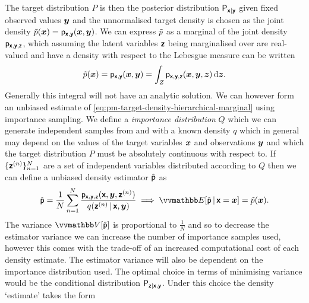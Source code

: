 The target distribution $P$ is then the posterior distribution $\mathsf{P}_{\boldsymbol{\mathsf{x}}|\boldsymbol{\mathsf{y}}}$ given fixed observed values $\boldsymbol{y}$ and the unnormalised target density is chosen as the joint density $\tilde{p}(\boldsymbol{x}) = \mathsf{p}_{\boldsymbol{\mathsf{x}},\boldsymbol{\mathsf{y}}}(\boldsymbol{x},\boldsymbol{y})$. We can express $\tilde{p}$ as a marginal of the joint density $\mathsf{p}_{\boldsymbol{\mathsf{x}},\boldsymbol{\mathsf{y}},\boldsymbol{\mathsf{z}}}$, which assuming the latent variables $\boldsymbol{\mathsf{z}}$ being marginalised over are real-valued and have a density with respect to the Lebesgue measure can be written
\begin{equation}\label{eq:pm-target-density-hierarchical-marginal}
  \tilde{p}(\boldsymbol{x}) = \mathsf{p}_{\boldsymbol{\mathsf{x}},\boldsymbol{\mathsf{y}}}(\boldsymbol{x},\boldsymbol{y}) =
  \int_{\mathit{Z}} \mathsf{p}_{\boldsymbol{\mathsf{x}},\boldsymbol{\mathsf{y}},\boldsymbol{\mathsf{z}}}(\boldsymbol{x},\boldsymbol{y},\boldsymbol{z}) \,\mathrm{d}\boldsymbol{z}.
\end{equation}
Generally this integral will not have an analytic solution. We can however form an unbiased estimate of \eqref{eq:pm-target-density-hierarchical-marginal} using importance sampling. We define a \emph{importance distribution} $Q$ which we can generate independent samples from and with a known density $q$ which in general may depend on the values of the target variables $\boldsymbol{x}$ and observations $\boldsymbol{y}$ and which the target distribution $P$ must be absolutely continuous with respect to. If $\lbrace \boldsymbol{\mathsf{z}}^{(n)} \rbrace_{n=1}^N$ are a set of independent variables distributed according to $Q$ then we can define a unbiased density estimator $\hat{\mathsf{p}}$ as
\begin{equation}\label{eq:pm-hierarchical-model-importance-sampling-estimator}
  \hat{\rvar{p}} = \frac{1}{N} \sum_{n=1}^N \frac{\pden{\rvct{x},\rvct{y},\rvct{z}}(\rvct{x},\vct{y},\rvct{z}^{(n)})}{q(\rvct{z}^{(n)}\gvn\rvct{x},\vct{y})} \implies
  \expc{\hat{\rvar{p}}\gvn\rvct{x} = \vct{x}} = \utgtdens(\vct{x}).
\end{equation}
The variance $\var{\hat{\rvar{p}}}$ is proportional to $\frac{1}{N}$ and so to decrease the estimator variance we can increase the number of importance samples used, however this comes with the trade-off of an increased computational cost of each density estimate. The estimator variance will also be dependent on the importance distribution used. The optimal choice in terms of minimising variance would be the conditional distribution $\mathsf{P}_{\boldsymbol{\mathsf{z}}|\boldsymbol{\mathsf{x}},\boldsymbol{\mathsf{y}}}$. Under this choice the density `estimate' takes the form
